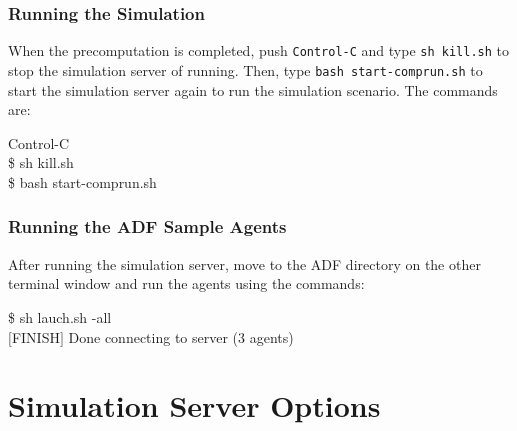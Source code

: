 \documentclass{article}
\begin{document}
\subsubsection{Running the Simulation}
When the precomputation is completed, push \texttt{Control-C} and type \texttt{sh kill.sh} to stop the simulation server of running. Then, type \texttt{bash start-comprun.sh} to start the simulation server again to run the simulation scenario. The commands are:

\begin{center}
   \begin{tcolorbox}[title=Running Simulation Server, width=.98\linewidth]
    {\ttfamily
    Control-C\\
    \$ sh kill.sh\\
    \$ bash start-comprun.sh
    }
  \end{tcolorbox}
\end{center}

\subsubsection{Running the ADF Sample Agents}
After running the simulation server, move to the ADF directory on the other terminal window and run the agents using the commands:

\begin{center}
   \begin{tcolorbox}[title=Running Sample Agents, width=.98\linewidth]
    {\ttfamily
    \$ sh lauch.sh -all\\
    $[$FINISH$]$ Done connecting to server (3 agents)
    }
  \end{tcolorbox}
\end{center}

\section{Simulation Server Options}
\end{document}

